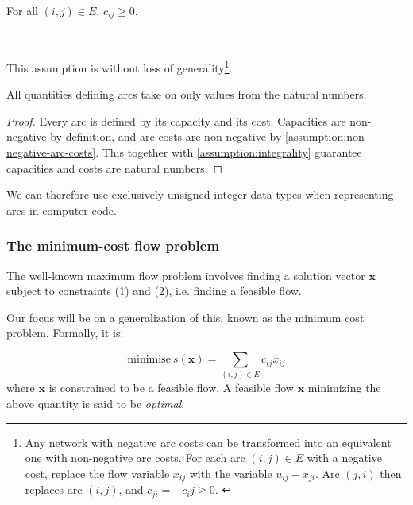 \begin{assumption} \label{assumption:non-negative-arc-costs}
For all $(i,j) \in E$, $c_{ij} \geq 0$.\end{assumption}

~

\begin{remark} 
This assumption is without loss of generality\footnote{Any network with negative arc costs can be transformed into an equivalent one with non-negative arc costs. For each arc $(i,j) \in E$ with a negative cost, replace the flow variable $x_{ij}$ with the variable $u_{ij} - x_{ji}$. Arc $(j,i)$ then replaces arc $(i,j)$, and $c_{ji} = -c_ij \geq 0$. \cite[p.~48]{Ahuja:1993}}.
\end{remark}

\begin{cor}All quantities defining arcs take on only values from the natural numbers.\footnotemark
{}
\end{cor}
\begin{proof}
Every arc is defined by its capacity and its cost. Capacities are non-negative by definition, and arc costs are non-negative by \cref{assumption:non-negative-arc-costs}. This together with \cref{assumption:integrality} guarantee capacities and costs are natural numbers.
\end{proof}

We can therefore use exclusively unsigned integer data types when representing arcs in computer code.

\subsubsection{The minimum-cost flow problem} \label{sec:prep-flow-mcf}

The well-known maximum flow problem involves finding a solution vector
$\mathbf{x}$ subject to constraints (1) and (2), i.e. finding a feasible
flow.

Our focus will be on a generalization of this, known as the minimum
cost problem. Formally, it is:

\begin{equation} \label{eq:mcf-primal-problem}
\mbox{minimise}\ s(\mathbf{x})=\sum_{(i,j)\in E}c_{ij}x_{ij}
\end{equation}
where $\mathbf{x}$ is constrained to be a feasible flow. A feasible
flow $\mathbf{x}$ minimizing the above quantity is said to be \emph{optimal}.

